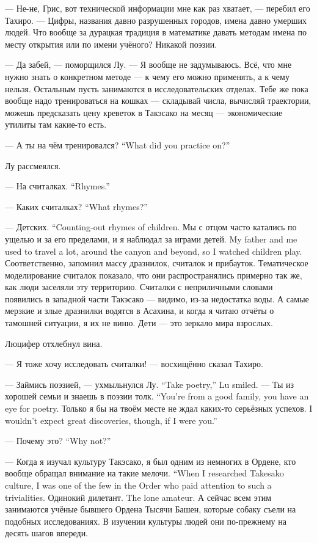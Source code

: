 --- Не-не, Грис, вот технической информации мне как раз хватает, --- перебил его Тахиро.
--- Цифры, названия давно разрушенных городов, имена давно умерших людей.
Что вообще за дурацкая традиция в математике давать методам имена по месту открытия или по имени учёного?
Никакой поэзии.

--- Да забей, --- поморщился Лу.
--- Я вообще не задумываюсь.
Всё, что мне нужно знать о конкретном методе --- к чему его можно применять, а к чему нельзя.
Остальным пусть занимаются в исследовательских отделах.
Тебе же пока вообще надо тренироваться на кошках --- складывай числа, вычисляй траектории, можешь предсказать цену креветок в Такэсако на месяц --- экономические утилиты там какие-то есть.

{--- А ты на чём тренировался?}
{``What did you practice on?''}

Лу рассмеялся.

{--- На считалках.}
{``Rhymes.''}

{--- Каких считалках?}
{``What rhymes?''}

{--- Детских.}
{``Counting-out rhymes of children.}
{Мы с отцом часто катались по ущелью и за его пределами, и я наблюдал за играми детей.}
{My father and me used to travel a lot, around the canyon and beyond, so I watched children play.}
Соответственно, запомнил массу дразнилок, считалок и прибауток.
Тематическое моделирование считалок показало, что они распространялись примерно так же, как люди заселяли эту территорию.
Считалки с неприличными словами появились в западной части Такэсако --- видимо, из-за недостатка воды.
А самые мерзкие и злые дразнилки водятся в Асахина, и когда я читаю отчёты о тамошней ситуации, я их не виню.
Дети --- это зеркало мира взрослых.

Люцифер отхлебнул вина.

--- Я тоже хочу исследовать считалки! --- восхищённо сказал Тахиро.

{--- Займись поэзией, --- ухмыльнулся Лу.}
{``Take poetry,'' Lu smiled.}
{--- Ты из хорошей семьи и знаешь в поэзии толк.}
{``You're from a good family, you have an eye for poetry.}
{Только я бы на твоём месте не ждал каких-то серьёзных успехов.}
{I wouldn't expect great discoveries, though, if I were you.''}

{--- Почему это?}
{``Why not?''}

{--- Когда я изучал культуру Такэсако, я был одним из немногих в Ордене, кто вообще обращал внимание на такие мелочи.}
{``When I researched Takesako culture, I was one of the few in the Order who paid attention to such a trivialities.}
{Одинокий дилетант.}
{The lone amateur.}
А сейчас всем этим занимаются учёные бывшего Ордена Тысячи Башен, которые собаку съели на подобных исследованиях.
В изучении культуры людей они по-прежнему на десять шагов впереди.

